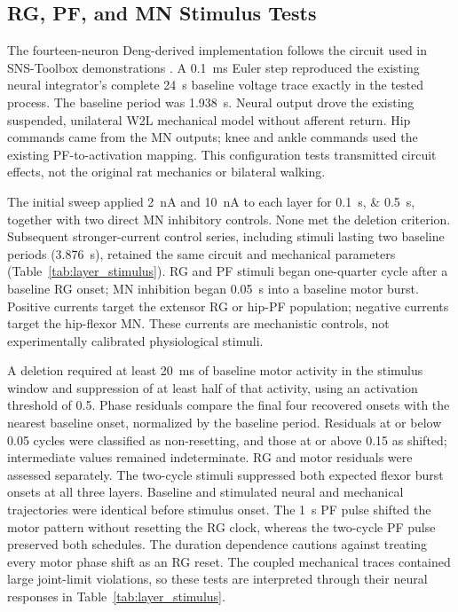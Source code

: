 \subsection{RG, PF, and MN Stimulus Tests}\label{sec:app_layer_stimulus}

The fourteen-neuron Deng-derived implementation follows the circuit used in SNS-Toolbox demonstrations \citep{deng_neuromechanical_2019,nourse_sns_2023}. A \qty{0.1}{\milli\second} Euler step reproduced the existing neural integrator's complete \qty{24}{\second} baseline voltage trace exactly in the tested process. The baseline period was \qty{1.938}{\second}. Neural output drove the existing suspended, unilateral W2L mechanical model without afferent return. Hip commands came from the MN outputs; knee and ankle commands used the existing PF-to-activation mapping. This configuration tests transmitted circuit effects, not the original rat mechanics or bilateral walking.

The initial sweep applied \qty{+2}{\nano\ampere} and \qty{+10}{\nano\ampere} to each layer for \qtylist{0.1;0.5}{\second}, together with two direct MN inhibitory controls. None met the deletion criterion. Subsequent stronger-current control series, including stimuli lasting two baseline periods (\qty{3.876}{\second}), retained the same circuit and mechanical parameters (Table~\ref{tab:layer_stimulus}). RG and PF stimuli began one-quarter cycle after a baseline RG onset; MN inhibition began \qty{0.05}{\second} into a baseline motor burst. Positive currents target the extensor RG or hip-PF population; negative currents target the hip-flexor MN. These currents are mechanistic controls, not experimentally calibrated physiological stimuli.

A deletion required at least \qty{20}{\milli\second} of baseline motor activity in the stimulus window and suppression of at least half of that activity, using an activation threshold of 0.5. Phase residuals compare the final four recovered onsets with the nearest baseline onset, normalized by the baseline period. Residuals at or below 0.05 cycles were classified as non-resetting, and those at or above 0.15 as shifted; intermediate values remained indeterminate. RG and motor residuals were assessed separately. The two-cycle stimuli suppressed both expected flexor burst onsets at all three layers. Baseline and stimulated neural and mechanical trajectories were identical before stimulus onset. The \qty{1}{\second} PF pulse shifted the motor pattern without resetting the RG clock, whereas the two-cycle PF pulse preserved both schedules. The duration dependence cautions against treating every motor phase shift as an RG reset. The coupled mechanical traces contained large joint-limit violations, so these tests are interpreted through their neural responses in Table~\ref{tab:layer_stimulus}.

